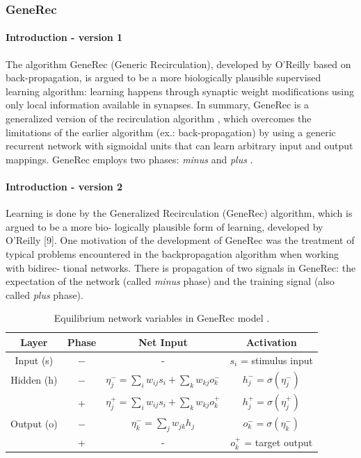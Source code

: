 \subsubsection{GeneRec}
\label{models-generec} 

\paragraph{Introduction - version 1} 
The algorithm GeneRec (Generic Recirculation), developed by O’Reilly \citet{o1996bio} based on back-propagation, is argued to be a more biologically plausible supervised learning algorithm: learning happens through synaptic weight modifications using only local information available in synapses. In summary, GeneRec is a generalized version of the recirculation algorithm \citet{hinton1988learning}, which overcomes the limitations of the earlier algorithm (ex.: back-propagation) by using a generic recurrent network with sigmoidal units that can learn arbitrary input and output mappings. GeneRec employs two phases: \emph{minus} and \emph{plus} \citet{da2011advances}. 

\paragraph{Introduction - version 2} 
Learning is done by the Generalized Recirculation
(GeneRec) algorithm, which is argued to be a more bio-
logically plausible form of learning, developed by O’Reilly
[9]. One motivation of the development of GeneRec was
the treatment of typical problems encountered in the
backpropagation algorithm when working with bidirec-
tional networks. There is propagation of two signals in
GeneRec: the expectation of the network (called \emph{minus}
phase) and the training signal (also called \emph{plus} phase).
\citet{schneider2009application} 

\begin{table}
  \centering
  \caption{Equilibrium network variables in GeneRec model \citet{farkas2013bal}.}
  \label{tab:gr-states}
  \begin{tabular}{|cccc|}
    \hline
    Layer & Phase & Net Input & Activation\\
    \hline
    Input (s)    & $-$ & - & $s_i$ = stimulus input\\
    \hline
    Hidden (h)   & $-$ & \hspace{0.3cm}$\eta^{-}_j = \sum_i w_{ij}s_i + \sum_k w_{kj}o^{-}_k$\hspace{0.3cm} &
    $h^{-}_j = \sigma(\eta^{-}_j)$\hspace{0.3cm}\\
          &  +  & $\eta^{+}_j = \sum_{i}w_{ij}s_i + \sum_k w_{kj}o^{+}_k$ & $h^{+}_{j} = \sigma(\eta^{+}_j)$ \\
    \hline
    Output (o) & $-$ & $\eta^{-}_k = \sum_j w_{jk}h_j$ & $o^{-}_k = \sigma(\eta^{-}_k)$\\
           &  +  & - & $o^{+}_k$ = target output \\
    \hline
  \end{tabular}
\end{table}


